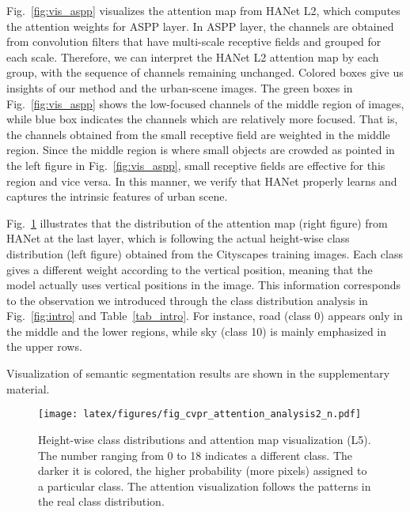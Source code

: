 \documentclass[10pt,twocolumn,letterpaper]{article}
\begin{document}
Fig.~\ref{fig:vis_aspp} visualizes the attention map from HANet L2, which 
computes the attention weights for ASPP layer. In ASPP layer, the channels are obtained from convolution filters that have multi-scale receptive fields and grouped for each scale. Therefore, we can interpret the HANet L2 attention map by each group, with the sequence of channels remaining unchanged. Colored boxes give us insights of our method and 
the urban-scene images. The green boxes in Fig.~\ref{fig:vis_aspp} shows the low-focused channels of the middle region of images, while blue box indicates the channels which are relatively more focused. That is, the channels obtained from the small receptive field are weighted in the middle region. Since the middle region is where small objects are crowded as pointed in the
left figure in Fig.~\ref{fig:vis_aspp}, small receptive fields are effective for this region and vice versa. In this manner, we verify that HANet properly learns and captures the intrinsic features of urban scene.


Fig.~\ref{fig:vis_last} illustrates that the distribution of the attention map (right figure) from HANet at the last layer, which is following
the actual height-wise class distribution (left figure) obtained from the Cityscapes training images. Each class gives a different weight according to the vertical position,
meaning that the model actually uses vertical positions in the image. This information corresponds to
the observation we introduced through the class distribution analysis in Fig.~\ref{fig:intro} and Table~\ref{tab_intro}. For instance, road (class 0) appears
only in the middle and the lower regions, while sky (class 10) is mainly emphasized in the upper rows.


Visualization of semantic segmentation results are shown in the supplementary material.


\begin{figure}[h]
\vspace*{-0.1cm}
\begin{center}
\texttt{[image: latex/figures/fig\_cvpr\_attention\_analysis2\_n.pdf]}
\end{center}
\vspace*{-0.5cm}
   \caption{Height-wise class distributions and attention map visualization (L5). The number ranging from 0 to 18 indicates a different class. The darker it is colored, the higher probability (more pixels) assigned to a particular class.
The attention visualization follows the patterns in the real class distribution.
   }
\label{fig:vis_last}
\vspace*{-0.5cm}
\end{figure}
\end{document}
